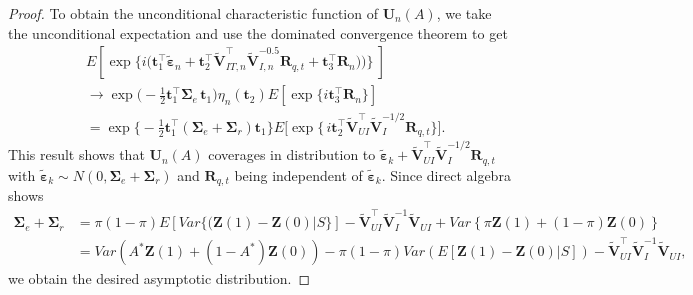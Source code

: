 \documentclass[12pt]{article}
\newcommand{\bZ}{\boldsymbol{Z}}
\newcommand{\bU}{\boldsymbol{U}}
\newcommand{\bR}{\boldsymbol{R}}
\newcommand{\bt}{\boldsymbol{t}}
\newcommand{\bSigma}{\mathbf{\Sigma}}
\newcommand{\bvarepsilon}{\boldsymbol{\varepsilon}}
\newcommand{\bfV}{\mathbf{V}}
\newcommand{\tbfV}{\widetilde{\bfV}}
\newcommand{\tbepsilon}{\widetilde{\bvarepsilon}}
\begin{document}
\begin{proof}
To obtain the unconditional characteristic function of $\bU_n(A)$, we take the unconditional expectation and use the dominated convergence theorem to get
\begin{align*}
    & E\!\left[\exp\!\Big\{i\big(\bt_1^\top \tbepsilon_n
+ \bt_2^\top \tbfV_{IT,n}^\top   \tbfV_{I,n}^{-0.5} \bR_{q,t}  + \bt_3^\top \bR_n)\big)\Big\}\ \right]\\
&\rightarrow \exp\!\Big(-\tfrac12 \bt_1^\top \bSigma_e\, \bt_1\Big) \eta_n(\bt_2) E[\exp\{i\bt_3^\top \bR_n\}] \\
&= \exp\!\Big\{-\tfrac12 \bt_1^\top (\bSigma_e +\bSigma_r) \bt_1\Big\} E\!\big[\exp\{\,i \bt_2^\top \tbfV_{UI}^\top \tbfV_I^{-1/2} \bR_{q,t}\}\big].
\end{align*}
This result shows that $\bU_n(A)$ coverages in distribution to $\tbepsilon_k + \tbfV_{UI}^\top \tbfV_I^{-1/2} \bR_{q,t}$ with $\tbepsilon_k \sim N(0, \bSigma_e +\bSigma_r)$ and $\bR_{q,t}$ being independent  of $\tbepsilon_k$. 
Since direct algebra shows
\begin{align*}
    \bSigma_e +\bSigma_r &= \pi(1-\pi)E[Var\{(\bZ(1)-\bZ(0)|S\}] - \tbfV_{UI}^\top \tbfV_I^{-1} \tbfV_{UI} + Var\left\{\pi \bZ(1) + (1-\pi) \bZ(0)\right\} \\
    &= Var(A^* \bZ(1) + (1-A^*) \bZ(0)) - \pi(1-\pi)Var(E[\bZ(1)-\bZ(0)|S]) - \tbfV_{UI}^\top \tbfV_I^{-1} \tbfV_{UI},
\end{align*}
we obtain the desired asymptotic distribution.
\end{proof}
\end{document}
